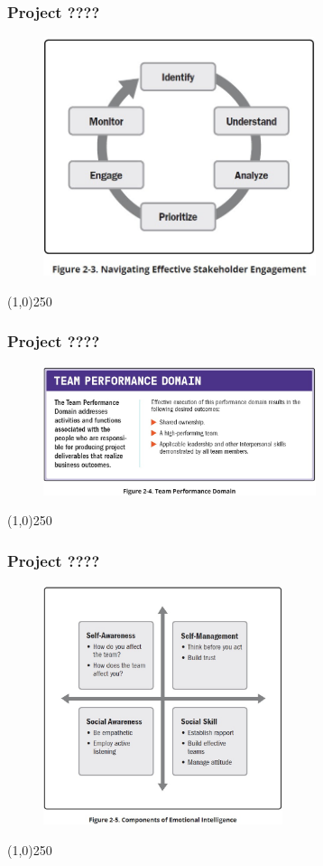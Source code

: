 \begin{frame}
\frametitle{Project ????}
 \begin{figure}
    \centering
        \includegraphics[width = 8cm]{../images/guide/Fig2-3.jpg}
    \label{guidefig:2-3}
 \end{figure}
\end{frame}
\begin{center}\line(1,0){250}\end{center}

\begin{frame}
\frametitle{Project ????}
 \begin{figure}
    \centering
        \includegraphics[width = 8cm]{../images/guide/Fig2-4.jpg}
    \label{guidefig:2-4}
 \end{figure}
\end{frame}
\begin{center}\line(1,0){250}\end{center}

\begin{frame}
\frametitle{Project ????}
 \begin{figure}
    \centering
        \includegraphics[width = 7cm]{../images/guide/Fig2-5.jpg}
    \label{guidefig:2-5}
 \end{figure}
\end{frame}
\begin{center}\line(1,0){250}\end{center}

